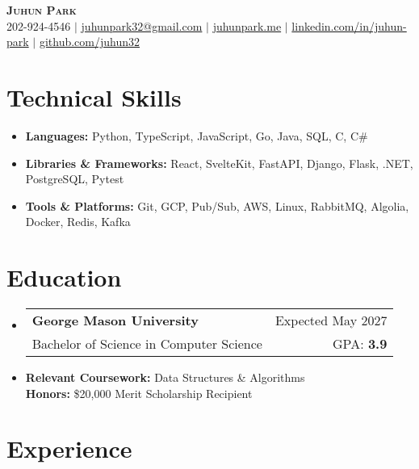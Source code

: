 \documentclass[letterpaper,11pt]{article}
\makeatletter
\newcommand{\resumeItem}[1]{
  \item{
    {#1}
  }
}
\newcommand{\resumeItemThin}[1]{
  \item{
    {#1 \vspace{-5pt}}
  }
}
\newcommand{\resumeSubheading}[4]{
    \item
    \begin{tabular*}{0.985\textwidth}[t]{l@{\extracolsep{\fill}}r@{\hspace{-0.1in}}}
        {\textbf{#1}} & {#2} \\
        #3 &  #4 \\
    \end{tabular*}\vspace{-5pt}
}
\newcommand{\resumeSubHeadingListStart}{\begin{itemize}[leftmargin=0.00in, rightmargin=-0.2in, label={}]\vspace{3pt}}
\newcommand{\resumeSubHeadingListEnd}{\end{itemize}\vspace{-5pt}}
\newcommand{\resumeItemListStart}{\vspace{3pt}\begin{itemize}[leftmargin=0.15in, rightmargin=0.15in]}
\newcommand{\resumeItemListEnd}{\end{itemize}\vspace{-5pt}}
\makeatother
\begin{document}

\begin{center}
  \textbf{\Huge \scshape {Juhun Park}} \\ \vspace{3pt}
   202-924-4546 $|$
  \href{mailto:juhunpark32@gmail.com}{juhunpark32@gmail.com} $|$
  \href{https://www.juhunpark.me/}{juhunpark.me} $|$
  \href{https://linkedin.com/in/juhun-park}{linkedin.com/in/juhun-park} $|$
  \href{https://github.com/juhun32}{github.com/juhun32} \\
\end{center}

\vspace{-10pt}


\section{Technical Skills}
\resumeItemListStart
\resumeItemThin{\textbf{Languages: }{Python, TypeScript, JavaScript, Go, Java, SQL, C, C\#}}\\
\resumeItemThin{\textbf{Libraries \& Frameworks: }{React, SvelteKit, FastAPI, Django, Flask, .NET, PostgreSQL, Pytest}}\\
\resumeItemThin{\textbf{Tools \& Platforms: }{Git, GCP, Pub/Sub, AWS, Linux, RabbitMQ, Algolia, Docker, Redis, Kafka}}\\
\resumeItemListEnd


\section{Education}
\resumeSubHeadingListStart
\resumeSubheading
{George Mason University}{Expected May 2027}
{Bachelor of Science in Computer Science}{GPA: \textbf{3.9}}
\resumeItem{\textbf{Relevant Coursework: }{Data Structures \& Algorithms}} \\
{\textbf{Honors: }{\$20,000 Merit Scholarship Recipient}}
\vspace{-5pt}
\resumeSubHeadingListEnd


\section{Experience}
\end{document}
